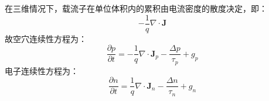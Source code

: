 在三维情况下，载流子在单位体积内的累积由电流密度的散度决定，即：
\begin{equation}
    -\frac{1}{q}\nabla\cdot \bm J
\end{equation}
故空穴连续性方程为：
\begin{equation}
    \frac{\partial p}{\partial t}=-\frac{1}{q}\nabla\cdot\bm J_p-\frac{\Delta p}{\tau_p}+g_p
\end{equation}
电子连续性方程为：
\begin{equation}
    \frac{\partial n}{\partial t}=\frac{1}{q}\nabla \cdot\bm J_n-\frac{\Delta n}{\tau_n}+g_n
\end{equation}






